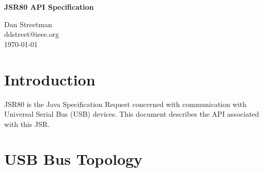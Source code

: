 \documentclass{article}
\newcommand{\mytitle}[0]{JSR80 API Specification}
\newcommand{\myauthor}[0]{Dan Streetman}
\newcommand{\mydate}[0]{\today}
\newcommand{\mysectionend}[0]{\vfill\pagebreak[1]}
\begin{document}
\pagestyle{empty}


%

\begin{titlepage}

\begin{center}
\Huge{\textbf{\mytitle}}
\end{center}

\vfill
\vfill

\begin{flushright}
\large{\myauthor}
\\
\large{ddstreet@ieee.org}
\\
\large{\mydate}
\end{flushright}

\vfill

\end{titlepage}

%

\pagestyle{fancy}
\fancyhf{}
\renewcommand{\sectionmark}[1]{\markright{\emph{\mytitle}}}
\renewcommand{\subsectionmark}[1]{\markright{\emph{\mytitle}}}
\renewcommand{\subsubsectionmark}[1]{\markright{\emph{\mytitle}}}
\fancyhead[LE,RO]{\bfseries\thepage}
\fancyhead[LO]{\rightmark}

%

\tableofcontents

\listoftables

\listoffigures

\pagebreak


%

\section{Introduction}

JSR80 is the Java Specification Request concerned with communication with
Universal Serial Bus (USB) devices.  This document describes the API associated
with this JSR.  

\mysectionend

%

\section{USB Bus Topology}
\end{document}
